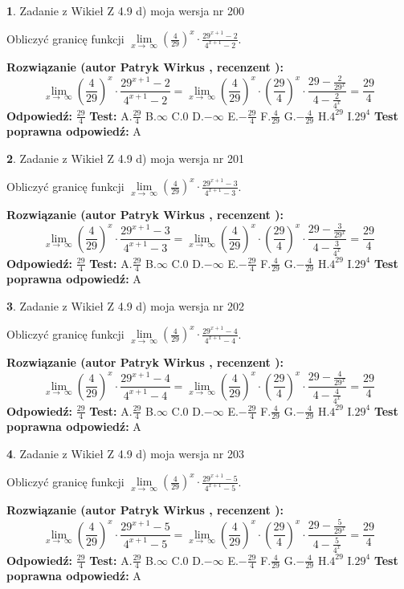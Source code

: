 \documentclass[12pt, a4paper]{article}
\theoremstyle{definition} %
\newtheorem{zad}{}
\newcommand{\zadStart}[1]{\begin{zad}#1\newline}
\newcommand{\zadStop}{\end{zad}}
\newcommand{\rozwStart}[2]{\noindent \textbf{Rozwiązanie (autor #1 , recenzent #2): }\newline}
\newcommand{\rozwStop}{\newline}
\newcommand{\odpStart}{\noindent \textbf{Odpowiedź:}\newline}
\newcommand{\odpStop}{\newline}
\newcommand{\testStart}{\noindent \textbf{Test:}\newline}
\newcommand{\testStop}{\newline}
\newcommand{\kluczStart}{\noindent \textbf{Test poprawna odpowiedź:}\newline}
\newcommand{\kluczStop}{\newline}
\begin{document}
\zadStart{Zadanie z Wikieł Z 4.9 d) moja wersja nr 200}


Obliczyć granicę funkcji  $\lim\limits_{x\to\ \infty}(\frac{4}{29})^{x}\cdot\frac{29^{x+1}-2}{4^{x+1}-2}$.
\zadStop
\rozwStart{Patryk Wirkus}{}
$$\lim\limits_{x\to\ \infty}(\frac{4}{29})^{x}\cdot\frac{29^{x+1}-2}{4^{x+1}-2}=\lim\limits_{x\to\ \infty}(\frac{4}{29})^{x}\cdot(\frac{29}{4})^{x} \cdot \frac{29-\frac{2}{29^{x}}}{4-\frac{2}{4^{x}}} = \frac{29}{4}$$
\rozwStop
\odpStart
$\frac{29}{4}$
\odpStop
\testStart
A.$\frac{29}{4}$ B.$\infty$ C.$0$ D.$-\infty$ E.$-\frac{29}{4}$
F.$\frac{4}{29}$ G.$-\frac{4}{29}$
H.$4^{29}$
I.$29^{4}$
\testStop
\kluczStart
A
\kluczStop



\zadStart{Zadanie z Wikieł Z 4.9 d) moja wersja nr 201}


Obliczyć granicę funkcji  $\lim\limits_{x\to\ \infty}(\frac{4}{29})^{x}\cdot\frac{29^{x+1}-3}{4^{x+1}-3}$.
\zadStop
\rozwStart{Patryk Wirkus}{}
$$\lim\limits_{x\to\ \infty}(\frac{4}{29})^{x}\cdot\frac{29^{x+1}-3}{4^{x+1}-3}=\lim\limits_{x\to\ \infty}(\frac{4}{29})^{x}\cdot(\frac{29}{4})^{x} \cdot \frac{29-\frac{3}{29^{x}}}{4-\frac{3}{4^{x}}} = \frac{29}{4}$$
\rozwStop
\odpStart
$\frac{29}{4}$
\odpStop
\testStart
A.$\frac{29}{4}$ B.$\infty$ C.$0$ D.$-\infty$ E.$-\frac{29}{4}$
F.$\frac{4}{29}$ G.$-\frac{4}{29}$
H.$4^{29}$
I.$29^{4}$
\testStop
\kluczStart
A
\kluczStop



\zadStart{Zadanie z Wikieł Z 4.9 d) moja wersja nr 202}


Obliczyć granicę funkcji  $\lim\limits_{x\to\ \infty}(\frac{4}{29})^{x}\cdot\frac{29^{x+1}-4}{4^{x+1}-4}$.
\zadStop
\rozwStart{Patryk Wirkus}{}
$$\lim\limits_{x\to\ \infty}(\frac{4}{29})^{x}\cdot\frac{29^{x+1}-4}{4^{x+1}-4}=\lim\limits_{x\to\ \infty}(\frac{4}{29})^{x}\cdot(\frac{29}{4})^{x} \cdot \frac{29-\frac{4}{29^{x}}}{4-\frac{4}{4^{x}}} = \frac{29}{4}$$
\rozwStop
\odpStart
$\frac{29}{4}$
\odpStop
\testStart
A.$\frac{29}{4}$ B.$\infty$ C.$0$ D.$-\infty$ E.$-\frac{29}{4}$
F.$\frac{4}{29}$ G.$-\frac{4}{29}$
H.$4^{29}$
I.$29^{4}$
\testStop
\kluczStart
A
\kluczStop



\zadStart{Zadanie z Wikieł Z 4.9 d) moja wersja nr 203}


Obliczyć granicę funkcji  $\lim\limits_{x\to\ \infty}(\frac{4}{29})^{x}\cdot\frac{29^{x+1}-5}{4^{x+1}-5}$.
\zadStop
\rozwStart{Patryk Wirkus}{}
$$\lim\limits_{x\to\ \infty}(\frac{4}{29})^{x}\cdot\frac{29^{x+1}-5}{4^{x+1}-5}=\lim\limits_{x\to\ \infty}(\frac{4}{29})^{x}\cdot(\frac{29}{4})^{x} \cdot \frac{29-\frac{5}{29^{x}}}{4-\frac{5}{4^{x}}} = \frac{29}{4}$$
\rozwStop
\odpStart
$\frac{29}{4}$
\odpStop
\testStart
A.$\frac{29}{4}$ B.$\infty$ C.$0$ D.$-\infty$ E.$-\frac{29}{4}$
F.$\frac{4}{29}$ G.$-\frac{4}{29}$
H.$4^{29}$
I.$29^{4}$
\testStop
\kluczStart
A
\kluczStop
\end{document}
